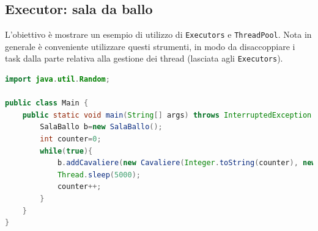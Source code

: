 \documentclass{article}
\begin{document}
\subsection{Executor: sala da ballo}

L'obiettivo \`e mostrare un esempio di utilizzo di \texttt{Executors} e \texttt{ThreadPool}. Nota in generale \`e conveniente utilizzare questi strumenti, in modo da disaccoppiare i task dalla parte relativa alla gestione dei thread (lasciata agli  \texttt{Executors}).

\begin{lstlisting}[language=Java]
import java.util.Random;

public class Main {
	public static void main(String[] args) throws InterruptedException {
		SalaBallo b=new SalaBallo();
		int counter=0;
		while(true){
			b.addCavaliere(new Cavaliere(Integer.toString(counter), new Random(), b));
			Thread.sleep(5000);
			counter++;
		}
	}
}
\end{lstlisting}
\end{document}
